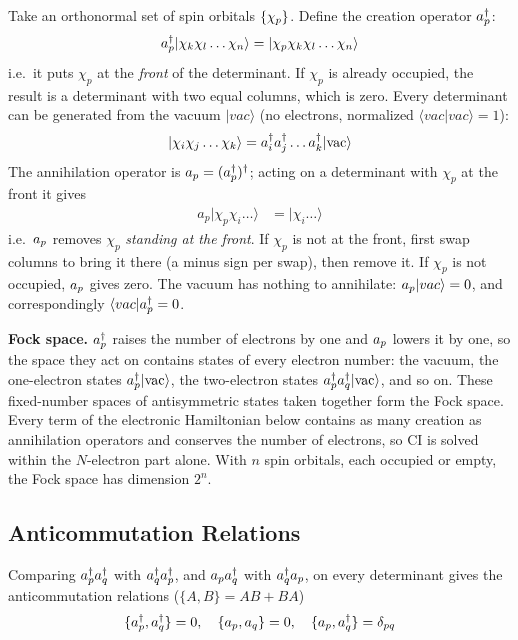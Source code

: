 Take an orthonormal set of spin orbitals $\{\chi_p\}$. Define the creation operator $a^{\dagger}_{p}$:
\begin{align*}
a^{\dagger}_{p} |\chi_k \chi_l \dots \chi_n\rangle = |\chi_p \chi_k \chi_l \dots \chi_n\rangle
\end{align*}
i.e.\ it puts $\chi_p$ at the \emph{front} of the determinant. If $\chi_p$ is already occupied, the result is a determinant with two equal columns, which is zero. Every determinant can be generated from the vacuum $|vac\rangle$ (no electrons, normalized $\langle vac|vac\rangle = 1$):
\begin{align*}
|\chi_i \chi_j \dots \chi_k\rangle = a^{\dagger}_{i} a^{\dagger}_{j} \dots a^{\dagger}_{k} |\text{vac}\rangle
\end{align*}
The annihilation operator is $a_{p} = (a^{\dagger}_{p})^\dagger$; acting on a determinant with $\chi_p$ at the front it gives
\begin{align*}
a_p |\chi_p \chi_i \dots\rangle &= |\chi_i \dots\rangle
\end{align*}
i.e.\ $a_{p}$ removes $\chi_p$ \emph{standing at the front}. If $\chi_p$ is not at the front, first swap columns to bring it there (a minus sign per swap), then remove it. If $\chi_p$ is not occupied, $a_{p}$ gives zero. The vacuum has nothing to annihilate: $a_{p} |vac\rangle = 0$, and correspondingly $\langle vac| a^{\dagger}_{p} = 0$.

\textbf{Fock space.} $a^{\dagger}_{p}$ raises the number of electrons by one and $a_{p}$ lowers it by one, so the space they act on contains states of every electron number: the vacuum, the one-electron states $a^{\dagger}_{p} |\text{vac}\rangle$, the two-electron states $a^{\dagger}_{p} a^{\dagger}_{q} |\text{vac}\rangle$, and so on. These fixed-number spaces of antisymmetric states taken together form the Fock space. Every term of the electronic Hamiltonian below contains as many creation as annihilation operators and conserves the number of electrons, so CI is solved within the $N$-electron part alone. With $n$ spin orbitals, each occupied or empty, the Fock space has dimension $2^n$.

\subsection{Anticommutation Relations}

Comparing $a^{\dagger}_{p} a^{\dagger}_{q}$ with $a^{\dagger}_{q} a^{\dagger}_{p}$, and $a_{p} a^{\dagger}_{q}$ with $a^{\dagger}_{q} a_{p}$, on every determinant gives the anticommutation relations ($\{A, B\} = A B + B A$)
\begin{align}\label{eq:anticomm}
\{a^{\dagger}_{p}, a^{\dagger}_{q}\} = 0, \quad \{a_p, a_q\} = 0, \quad \{a_p, a^{\dagger}_{q}\} = \delta_{pq}
\end{align}


